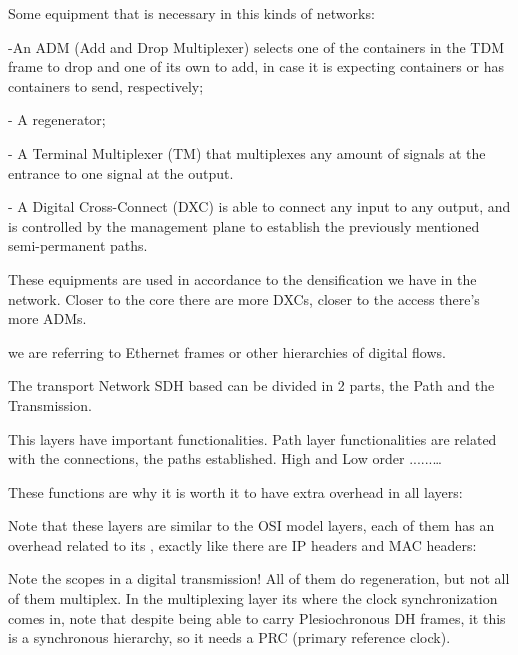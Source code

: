 



Some equipment that is necessary in this kinds of networks:

-An ADM (Add and Drop Multiplexer) selects one of the containers in the TDM frame to drop and one of its own to add, in case it is expecting containers or has containers to send, respectively;

- A regenerator;

- A Terminal Multiplexer (TM) that multiplexes any amount of signals at the entrance to one signal at the output.

- A Digital Cross-Connect (DXC) is able to connect any input to any output, and is controlled by the management plane to establish the previously mentioned semi-permanent paths.




These equipments are used in accordance to the densification we have in the network. Closer to the core there are more DXCs, closer to the access there's more ADMs.


 we are referring to Ethernet frames or other hierarchies of digital flows.






The transport Network SDH based can be divided in 2 parts, the Path and the Transmission.



This layers have important functionalities. Path layer functionalities are related with the connections, the paths established. High and Low order ......\dots

These functions are why it is worth it to have extra overhead in all layers:

Note that these layers are similar to the OSI model layers, each of them has an overhead related to its , exactly like there are IP headers and MAC headers:


Note the scopes in a digital transmission! All of them do regeneration, but not all of them multiplex. In the multiplexing layer its where the clock synchronization comes in, note that despite being able to carry Plesiochronous DH frames, it this is a synchronous hierarchy, so it needs a PRC (primary reference clock).


